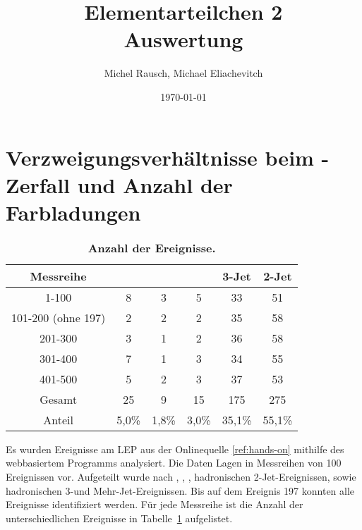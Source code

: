 \documentclass[a4paper,ngerman]{scrartcl}
\title{Elementarteilchen 2\\Auswertung}
\date{\today}
\author{Michel Rausch, Michael Eliachevitch}
\begin{document}
\maketitle
\tableofcontents
\newpage


\section{Verzweigungsverhältnisse beim \PZzero-Zerfall und Anzahl der Farbladungen}
\label{sec:verzweigungen}

\begin{table}
\centering
\caption{\textbf{Anzahl der Ereignisse.}}
\begin{tabular}{cccccc}
\toprule
Messreihe			&	\Pelectron\APelectron	&	\Ptauon\APtauon	&	\Pmuon\APmuon	&	3-Jet	&	2-Jet	\\
\midrule
1-100				& 	8	&	3	&	5	&	33	&	51	\\
101-200 (ohne 197)	& 	2	&	2	&	2	&	35	&	58	\\
201-300				&	3	&	1	&	2	&	36	&	58	\\
301-400				&	7	&	1	&	3	&	34	&	55	\\
401-500				&	5	&	2	&	3	&	37	&	53	\\
Gesamt				&	25	&	9	&	15	&	175	&	275	\\
Anteil				&5,0\%	&1,8\%  &3,0\%	&35,1\%	&55,1\%	\\
\bottomrule
\end{tabular}
\label{tab:count}
\end{table}

Es wurden Ereignisse am LEP aus der Onlinequelle \ref{ref:hands-on} mithilfe des webbasiertem Programms analysiert.
Die Daten Lagen in Messreihen von 100 Ereignissen vor.
Aufgeteilt wurde nach \Pelectron\APelectron ,	\Ptauon\APtauon	,	\Pmuon\APmuon , hadronischen 2-Jet-Ereignissen, sowie hadronischen 3-und Mehr-Jet-Ereignissen.
Bis auf dem Ereignis 197 konnten alle Ereignisse identifiziert werden.
Für jede Messreihe ist die Anzahl der unterschiedlichen Ereignisse in Tabelle~\ref{tab:count} aufgelistet.
\end{document}
